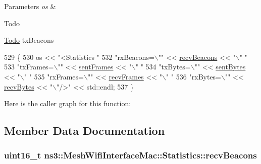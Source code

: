 \begin{DoxyParams}{Parameters}
{\em os} & \\
\hline
\end{DoxyParams}
\begin{DoxyRefDesc}{Todo}
\item[\hyperlink{todo__todo000130}{Todo}]tx\+Beacons \end{DoxyRefDesc}

\begin{DoxyCode}
529 \{
530   os << \textcolor{stringliteral}{"<Statistics "}
532     \textcolor{stringliteral}{"rxBeacons=\(\backslash\)""} << \hyperlink{structns3_1_1MeshWifiInterfaceMac_1_1Statistics_ae9d9c10ed7681fe6ae3dd127ad6d5788}{recvBeacons} << \textcolor{stringliteral}{"\(\backslash\)" "}
533     \textcolor{stringliteral}{"txFrames=\(\backslash\)""} << \hyperlink{structns3_1_1MeshWifiInterfaceMac_1_1Statistics_a0ac5f3c2cf39ac74bf402850beb202fb}{sentFrames} << \textcolor{stringliteral}{"\(\backslash\)" "}
534     \textcolor{stringliteral}{"txBytes=\(\backslash\)""} << \hyperlink{structns3_1_1MeshWifiInterfaceMac_1_1Statistics_a3355f31cf6a746c97c0fedba7bfdba43}{sentBytes} << \textcolor{stringliteral}{"\(\backslash\)" "}
535     \textcolor{stringliteral}{"rxFrames=\(\backslash\)""} << \hyperlink{structns3_1_1MeshWifiInterfaceMac_1_1Statistics_a5c415eaaf3b19754785b520741d1cb2b}{recvFrames} << \textcolor{stringliteral}{"\(\backslash\)" "}
536     \textcolor{stringliteral}{"rxBytes=\(\backslash\)""} << \hyperlink{structns3_1_1MeshWifiInterfaceMac_1_1Statistics_a1212fbc4174106637d4baa66bccecae7}{recvBytes} << \textcolor{stringliteral}{"\(\backslash\)"/>"} << std::endl;
537 \}
\end{DoxyCode}


Here is the caller graph for this function\+:




\subsection{Member Data Documentation}
\subsubsection[{\texorpdfstring{recv\+Beacons}{recvBeacons}}]{\setlength{\rightskip}{0pt plus 5cm}uint16\+\_\+t ns3\+::\+Mesh\+Wifi\+Interface\+Mac\+::\+Statistics\+::recv\+Beacons}\hypertarget{structns3_1_1MeshWifiInterfaceMac_1_1Statistics_ae9d9c10ed7681fe6ae3dd127ad6d5788}{}\label{structns3_1_1MeshWifiInterfaceMac_1_1Statistics_ae9d9c10ed7681fe6ae3dd127ad6d5788}


